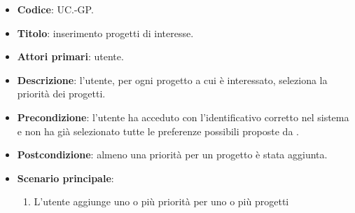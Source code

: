     \begin{itemize}
        \item \textbf{Codice}: UC\theuccount.\thesubuccount-GP.
        \item \textbf{Titolo}: inserimento progetti di interesse.
        \item \textbf{Attori primari}: utente.
        \item \textbf{Descrizione}: l'utente, per ogni progetto a cui è interessato, seleziona la priorità dei progetti.
        \item \textbf{Precondizione}: l'utente ha acceduto con l'identificativo corretto nel sistema e non ha già selezionato tutte le preferenze possibili proposte da \progetto.
        \item \textbf{Postcondizione}: almeno una priorità per un progetto è stata aggiunta.
        \item \textbf{Scenario principale}:
        \begin{enumerate}
            \item L'utente aggiunge uno o più priorità per uno o più progetti
        \end{enumerate}
    \end{itemize}